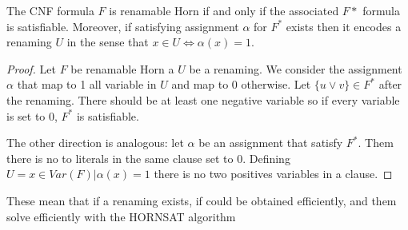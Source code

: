 \begin{theorem}
  The CNF formula $F$ is renamable Horn if and only if the associated $F*$ formula is satisfiable. Moreover, if satisfying assignment $\alpha$ for $F^*$  exists then it encodes a renaming $U$ in the sense that $x \in U \iff \alpha(x) = 1$.
\end{theorem}
\begin{proof}
  Let $F$ be renamable Horn a $U$ be a renaming. We consider the assignment $\alpha$ that map to 1 all variable in $U$ and map to 0 otherwise. Let $\{u\vee v\} \in F^*$ after the renaming. There should be at least one negative variable so if every variable is set to 0, $F^*$ is satisfiable.

  The other direction is analogous: let $\alpha$ be an assignment that satisfy $F^*$. Them there is no to literals in the same clause set to 0. Defining $U=  {x \in Var(F) | \alpha(x) = 1}$ there is no two positives variables in a clause.
  \end{proof}


These mean that if a renaming exists, if could be obtained efficiently, and them solve efficiently with the HORNSAT algorithm






